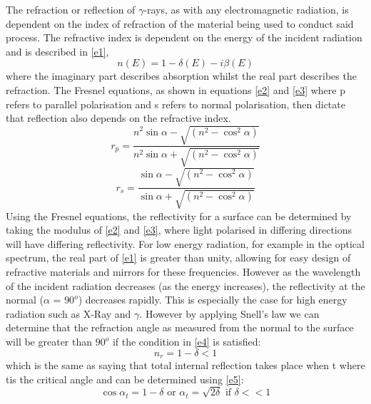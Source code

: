 The refraction or reflection of $\gamma$-rays, as with any electromagnetic radiation, is dependent on the index of refraction of the material being used to conduct said process. The refractive index is dependent on the energy of the incident radiation and is described in \ref{e1}, 
\begin{equation}
\label{e1}
n(E) = 1 - \delta(E)-i\beta(E)
\end{equation}
where the imaginary part describes absorption whilst the real part describes the refraction. The Fresnel equations, as shown in equations \ref{e2} and \ref{e3} where p refers to parallel polarisation and s refers to normal polarisation, then dictate that reflection also depends on the refractive index. 
\begin{equation}
\label{e2}
r_p =\frac{n^2\sin\alpha-\sqrt{(n^2-\cos^2\alpha)}}{n^2\sin\alpha+\sqrt{(n^2-\cos^2\alpha)}}
\end{equation}
\begin{equation}
\label{e3}
r_s =\frac{\sin\alpha-\sqrt{(n^2-\cos^2\alpha)}}{\sin\alpha+\sqrt{(n^2-\cos^2\alpha)}}
\end{equation}
Using the Fresnel equations, the reflectivity for a surface can be determined by taking the modulus of \ref{e2} and \ref{e3}, where light polarised in differing directions will have differing reflectivity.  For low energy radiation, for example in the optical spectrum, the real part of \ref{e1} is greater than unity, allowing for easy design of refractive materials and mirrors for these frequencies. However as the wavelength of the incident radiation decreases (as the energy increases), the reflectivity at the normal ($\alpha$ = $90^o$) decreases rapidly. This is especially the case for high energy radiation such as X-Ray and $\gamma$. However by applying Snell’s law we can determine that the refraction angle as measured from the normal to the surface will be greater than $90^o$ if the condition in \ref{e4} is satisfied:
\begin{equation}
\label{e4}
n_r = 1 - \delta < 1
\end{equation}
which is the same as saying that total internal reflection takes place when t where tis the critical angle and can be determined using \ref{e5}:
\begin{equation}
\label{e5}
\cos\alpha_t = 1 - \delta \textrm{ or } \alpha_t = \sqrt{2\delta} \textrm{ if } \delta<<1
\end{equation}
\newline
\newline

